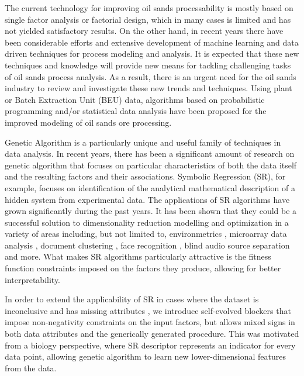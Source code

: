 \documentclass[10pt,journal,compsoc]{IEEEtran}
\begin{document}
The current technology for improving oil sands processability is mostly based on single factor analysis or factorial design, which in many cases is limited and has not yielded satisfactory results. On the other hand, in recent years there have been considerable efforts and extensive development of machine learning and data driven techniques for process modeling and analysis. It is expected that these new techniques and knowledge will provide new means for tackling challenging tasks of oil sands process analysis. As a result, there is an urgent need for the oil sands industry to review and investigate these new trends and techniques. Using plant or Batch Extraction Unit (BEU) data, algorithms based on probabilistic programming and/or statistical data analysis have been proposed for the improved modeling of oil sands ore processing\cite{ZhangANN}.






Genetic Algorithm is a particularly unique and useful family of techniques in data analysis. In recent years, there has been a significant amount of research on genetic algorithm that focuses on particular characteristics of both the data itself and the resulting factors and their associations. Symbolic Regression (SR), for example, focuses on identification of the analytical mathematical description of a hidden system from experimental data. The applications of SR algorithms have grown significantly during the past years. It has been shown that they could be a successful solution to dimensionality reduction modelling and optimization in a variety of areas including, but not limited to, environmetrics \cite{MichalewiczGP}, microarray  data analysis \cite{brunet2004metagenes,devarajan2008nonnegative,KozaGP}, document clustering \cite{berry2005email}, face recognition \cite{BurkardtImageGA, zafeiriou2006exploiting,kotsia2007novel}, blind audio source separation \cite{weninger2012optimization} and more. What makes SR algorithms particularly attractive is the fitness function constraints imposed on the factors they produce, allowing for better interpretability. 

In order to extend the applicability of SR in cases where the dataset is inconclusive and has missing attributes \cite{HouckGA}\cite{ding2010convex}, we introduce self-evolved blockers that impose non-negativity constraints on the input factors, but allows mixed signs in both data attributes and the generically generated procedure. This was motivated from a biology perspective, where SR descriptor represents an indicator for every data point, allowing genetic algorithm to learn new lower-dimensional features from the data.
\end{document}
